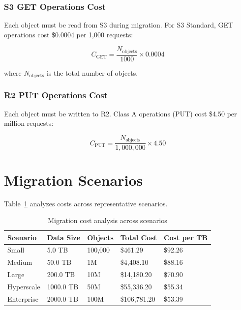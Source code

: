 \subsubsection{S3 GET Operations Cost}

Each object must be read from S3 during migration. For S3 Standard, GET operations cost \$0.0004 per 1,000 requests:

\begin{equation}
C_{\text{GET}} = \frac{N_{\text{objects}}}{1000} \times 0.0004
\end{equation}

where $N_{\text{objects}}$ is the total number of objects.

\subsubsection{R2 PUT Operations Cost}

Each object must be written to R2. Class A operations (PUT) cost \$4.50 per million requests:

\begin{equation}
C_{\text{PUT}} = \frac{N_{\text{objects}}}{1,000,000} \times 4.50
\end{equation}


\section{Migration Scenarios}\label{sec:scenarios}

Table~\ref{tab:migration-scenarios} analyzes costs across representative scenarios.

\begin{table}[H]
\centering
\caption{Migration cost analysis across scenarios}
\label{tab:migration-scenarios}
\begin{tabular}{p{2.5cm}p{2cm}p{2.5cm}p{2.5cm}p{2.5cm}}
\hline
\textbf{Scenario} & \textbf{Data Size} & \textbf{Objects} & \textbf{Total Cost} & \textbf{Cost per TB} \\
\hline
Small & 5.0 TB & 100,000 & \$461.29 & \$92.26 \\
Medium & 50.0 TB & 1M & \$4,408.10 & \$88.16 \\
Large & 200.0 TB & 10M & \$14,180.20 & \$70.90 \\
Hyperscale & 1000.0 TB & 50M & \$55,336.20 & \$55.34 \\
Enterprise & 2000.0 TB & 100M & \$106,781.20 & \$53.39 \\
\hline
\end{tabular}
\end{table}

